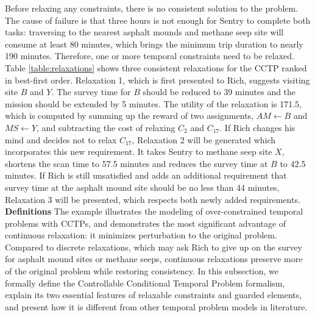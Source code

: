 \documentclass[jair,twoside,11pt,theapa]{article}
\begin{document}
%

Before relaxing any constraints, there is no consistent solution to the problem.
The cause of failure is that three hours is not enough for Sentry to complete
both tasks: traversing to the nearest asphalt mounds and methane seep site
will consume at least 80 minutes, which brings the minimum trip duration to nearly 190
minutes. Therefore, one or more temporal constraints need to be relaxed. Table
\ref{table:relaxations} shows three consistent relaxations for the CCTP ranked
in best-first order. Relaxation 1, which is first presented to Rich, suggests
visiting site $B$ and $Y$. The survey time for $B$ should be reduced to 39
minutes and the mission should be extended by 5 minutes. The utility of the
relaxation is 171.5, which is computed by summing up the reward of two
assignments, $AM \leftarrow B$ and $MS \leftarrow Y$, and subtracting the cost
of relaxing $C_2$ and $C_{17}$. If Rich changes his mind and decides not to
relax $C_{17}$, Relaxation 2 will be generated which incorporates this new
requirement. It takes Sentry to methane seep site $X$, shortens the scan time
to 57.5 minutes and reduces the survey time at $B$ to 42.5 minutes. If Rich is still
unsatisfied and adds an additional requirement that survey time at the
asphalt mound site should be no less than 44 minutes, Relaxation 3 will be presented, which respects both newly added requirements.\\



%


\noindent\textbf{Definitions} \indent The example illustrates the
modeling of over-constrained temporal problems with CCTPs, and demonstrates
the most significant advantage of continuous relaxation: it minimizes
perturbation to the original problem. Compared to discrete relaxations, which
may ask Rich to give up on the survey for asphalt mound sites or methane seeps,
continuous relaxations preserve more of the original problem while restoring
consistency. In this subsection, we formally define the Controllable Conditional
Temporal Problem formalism, explain its two essential features of relaxable
constraints and guarded elements, and present how it is different from other
temporal problem models in literature.
\end{document}
